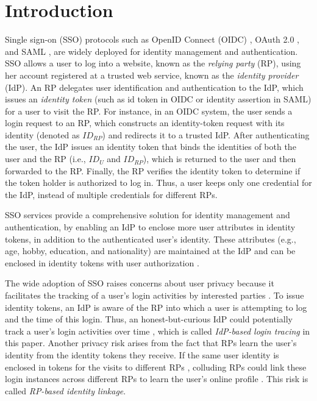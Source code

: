 \section{Introduction}
\label{sec:intro}
Single sign-on (SSO) protocols such as OpenID Connect (OIDC) \cite{OpenIDConnect}, OAuth 2.0 \cite{rfc6749}, and SAML \cite{SAML, SAMLIdentifier}, are widely deployed for identity management and authentication.
SSO allows a user to log into a website,
 known as the \emph{relying party} (RP), using her account registered at a trusted web service, known as the \emph{identity provider} (IdP).
An RP delegates user identification and authentication to the IdP, which issues an \emph{identity token} (such as id token in OIDC or identity assertion in SAML) for a user to visit the RP. %
For instance, in an OIDC system, the user sends a login request to an RP,
which constructs an identity-token request with its identity (denoted as $ID_{RP}$) and redirects it to a trusted IdP. After authenticating the user, the IdP issues an identity token that binds the identities of both the user and the RP (i.e., $ID_U$ and $ID_{RP}$), which is returned to the user and then forwarded to the RP.
Finally, the RP verifies the identity token to determine if the token holder is authorized to log in. Thus, a user keeps only one credential for the IdP, instead of multiple credentials for different RPs.

SSO services provide a comprehensive solution for identity management and authentication,
 by enabling an IdP to enclose more user attributes in identity tokens, in addition to the authenticated user's identity.
These attributes (e.g., age, hobby, education, and nationality) are maintained at the IdP and can be enclosed in identity tokens with user authorization \cite{OpenIDConnect,rfc6749}.

The wide adoption of SSO raises concerns about user privacy because it facilitates the tracking of a user's login activities by interested parties \cite{NIST2017draft, SPRESSO, BrowserID, maler2008venn}.
To issue identity tokens, %
 an IdP is aware of the RP into which a user is attempting to log and the time of this login.
Thus, an honest-but-curious IdP could potentially track a user's login activities over time \cite{BrowserID, SPRESSO},
which is called {\em IdP-based login tracing} in this paper.
Another privacy risk arises from the fact that RPs learn the user's identity from the identity tokens they receive.
If the same user identity is enclosed in tokens for the visits to different RPs \cite{maler2008venn, Google, FirefoxAccount}, colluding RPs could link these login instances across different RPs %
to learn the user's online profile \cite{maler2008venn}.
This risk is called {\em RP-based identity linkage}.


